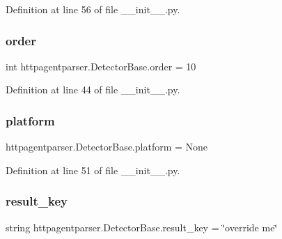 Definition at line 56 of file \+\_\+\+\_\+init\+\_\+\+\_\+.\+py.

\hypertarget{classhttpagentparser_1_1_detector_base_a92853159921546e362d2b1bd08856d04}{}\label{classhttpagentparser_1_1_detector_base_a92853159921546e362d2b1bd08856d04} 
\subsubsection{\texorpdfstring{order}{order}}
{\footnotesize\ttfamily int httpagentparser.\+Detector\+Base.\+order = 10\hspace{0.3cm}{\ttfamily [static]}}



Definition at line 44 of file \+\_\+\+\_\+init\+\_\+\+\_\+.\+py.

\hypertarget{classhttpagentparser_1_1_detector_base_a840ab673244412b0322624cfb778efad}{}\label{classhttpagentparser_1_1_detector_base_a840ab673244412b0322624cfb778efad} 
\subsubsection{\texorpdfstring{platform}{platform}}
{\footnotesize\ttfamily httpagentparser.\+Detector\+Base.\+platform = None\hspace{0.3cm}{\ttfamily [static]}}



Definition at line 51 of file \+\_\+\+\_\+init\+\_\+\+\_\+.\+py.

\hypertarget{classhttpagentparser_1_1_detector_base_a57798e45a12c271cb5de4a1ee64a5b7e}{}\label{classhttpagentparser_1_1_detector_base_a57798e45a12c271cb5de4a1ee64a5b7e} 
\subsubsection{\texorpdfstring{result\+\_\+key}{result\_key}}
{\footnotesize\ttfamily string httpagentparser.\+Detector\+Base.\+result\+\_\+key = \char`\"{}override me\char`\"{}\hspace{0.3cm}{\ttfamily [static]}}



